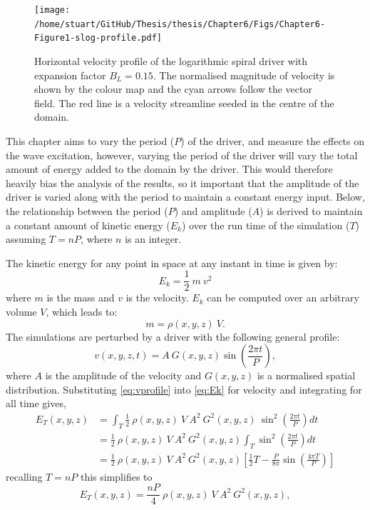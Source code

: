 \documentclass[a4paper,12pt,fourier,authoryear,custommargin]{Classes/PhDThesisPSnPDF}
\begin{document}
\begin{figure}[h]
    \centering
    \texttt{[image: /home/stuart/GitHub/Thesis/thesis/Chapter6/Figs/Chapter6-Figure1-slog-profile.pdf]}
    \caption{Horizontal velocity profile of the logarithmic spiral driver with expansion factor $B_L = 0.15$. The normalised magnitude of velocity is shown by the colour map and the cyan arrows follow the vector field. The red line is a velocity streamline seeded in the centre of the domain.}
    \label{fig:slog-profile}
\end{figure}

This chapter aims to vary the period ($P$) of the driver, and measure the effects on the wave excitation, however, varying the period of the driver will vary the total amount of energy added to the domain by the driver.
This would therefore heavily bias the analysis of the results, so it important that the amplitude of the driver is varied along with the period to maintain a constant energy input.
Below, the relationship between the period ($P$) and amplitude ($A$) is derived to maintain a constant amount of kinetic energy ($E_k$) over the run time of the simulation ($T$) assuming $T = nP$, where $n$ is an integer.

The kinetic energy for any point in space at any instant in time is given by:
\begin{equation}
    E_k = \frac{1}{2}\ m\ v^2\label{eq:Ek}
\end{equation}
where $m$ is the mass and $v$ is the velocity.
$E_k$ can be computed over an arbitrary volume $V$, which leads to:
\begin{equation}
    m = \rho(x,y,z)\ V.\label{eq:mass}
\end{equation}
The simulations are perturbed by a driver with the following general profile:
\begin{equation}
    v(x,y,z,t) = A\ G(x,y,z) \sin \left( \frac{2\pi t}{P} \right),\label{eq:vprofile}
\end{equation}
where $A$ is the amplitude of the velocity and $G(x,y,z)$ is a normalised spatial distribution.
Substituting \cref{eq:vprofile} into \cref{eq:Ek} for velocity and integrating for all time gives,
\begin{align}
    E_{T}(x,y,z) &= \int_T \frac{1}{2}\ \rho(x,y,z)\ V\ A^2\ G^2(x,y,z)\ \sin^2\left(\frac{2\pi t}{P} \right) dt \\
    &= \frac{1}{2}\ \rho(x,y,z)\ V\ A^2\ G^2(x,y,z) \int_T \sin^2\left(\frac{2\pi t}{P} \right) dt \\
    & = \frac{1}{2}\ \rho(x,y,z)\ V\ A^2\ G^2(x,y,z) \left[ \frac{1}{2}T - \frac{P}{8\pi} \sin \left(\frac{4\pi T}{P} \right) \right]
\end{align}
recalling $T = nP$ this simplifies to 
\begin{equation}
    E_{T}(x,y,z) = \frac{nP}{4}\ \rho(x,y,z)\ V\ A^2\ G^2(x,y,z), \label{eq:Et_xyz}
\end{equation}
\end{document}
